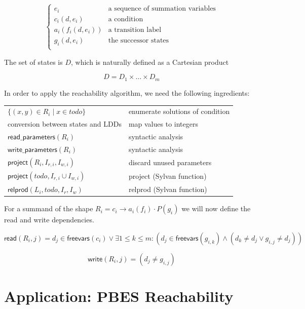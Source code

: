 \documentclass{article}
\newcommand{\var}[1]{\ensuremath{\textit{#1}}}
\begin{document}
\[
\left\{
\begin{array}{ll}
    e_i & \text{a sequence of summation variables} \\
    c_i(d, e_i) & \text{a condition} \\
    a_i(f_i(d,e_i)) & \text{a transition label} \\
    g_i(d,e_i) & \text{the successor states} \\
\end{array}
\right.
\]

\vspace{0.5cm}
\noindent
The set of states is $D$, which is naturally defined as a
Cartesian product

\[
D = D_1 \times \ldots \times D_m
\]

In order to apply the reachability algorithm, we need the following ingredients:

\begin{center}
\label{table:ingredients}
\begin{tabular}{ |l|l| }
\hline
$\{ (x,y) \in R_i \mid x \in todo \}$ & enumerate solutions of condition \\
conversion between states and LDDs & map values to integers \\
$\textsf{read\_parameters}(R_i)$ & syntactic analysis \\
$\textsf{write\_parameters}(R_i)$ & syntactic analysis \\
$\textsf{project}(R_i, I_{r,i}, I_{w,i})$ & discard unused parameters \\
$\textsf{project}(\var{todo}, I_{r,i} \cup I_{w,i})$ & \textsf{project} (Sylvan function) \\
$\textsf{relprod}(L_i, \var{todo}, I_r, I_w)$ & \textsf{relprod} (Sylvan function) \\
\hline
\end{tabular}
\end{center}

\noindent
For a summand of the shape $R_i = c_i \rightarrow a_i(f_i) \cdot P(g_i)$ we will now define the read and write dependencies.

\[
\textsf{read}(R_i, j) = 
d_j \in \textsf{freevars}(c_i) \lor
\exists 1 \leq k \leq m: (d_j \in \textsf{freevars}(g_{i,k}) \land (d_k \neq d_j \lor g_{i,j} \neq d_j))
\]

\[
\textsf{write}(R_i, j) = (d_j \neq g_{i,j})
\]

\newpage
\section{Application: PBES Reachability}
\end{document}

